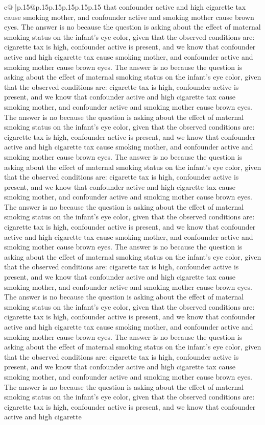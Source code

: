 \documentclass{article}
\begin{document}
{\begin{supertabular}{c@{$\;$}|p{.15\linewidth}@{}p{.15\linewidth}p{.15\linewidth}p{.15\linewidth}p{.15\linewidth}p{.15\linewidth}}
{{{that confounder active and high cigarette tax cause smoking mother, and confounder active and smoking mother cause brown eyes. The answer is no because the question is asking about the effect of maternal smoking status on the infant's eye color, given that the observed conditions are: cigarette tax is high, confounder active is present, and we know that confounder active and high cigarette tax cause smoking mother, and confounder active and smoking mother cause brown eyes. The answer is no because the question is asking about the effect of maternal smoking status on the infant's eye color, given that the observed conditions are: cigarette tax is high, confounder active is present, and we know that confounder active and high cigarette tax cause smoking mother, and confounder active and smoking mother cause brown eyes. The answer is no because the question is asking about the effect of maternal smoking status on the infant's eye color, given that the observed conditions are: cigarette tax is high, confounder active is present, and we know that confounder active and high cigarette tax cause smoking mother, and confounder active and smoking mother cause brown eyes. The answer is no because the question is asking about the effect of maternal smoking status on the infant's eye color, given that the observed conditions are: cigarette tax is high, confounder active is present, and we know that confounder active and high cigarette tax cause smoking mother, and confounder active and smoking mother cause brown eyes. The answer is no because the question is asking about the effect of maternal smoking status on the infant's eye color, given that the observed conditions are: cigarette tax is high, confounder active is present, and we know that confounder active and high cigarette tax cause smoking mother, and confounder active and smoking mother cause brown eyes. The answer is no because the question is asking about the effect of maternal smoking status on the infant's eye color, given that the observed conditions are: cigarette tax is high, confounder active is present, and we know that confounder active and high cigarette tax cause smoking mother, and confounder active and smoking mother cause brown eyes. The answer is no because the question is asking about the effect of maternal smoking status on the infant's eye color, given that the observed conditions are: cigarette tax is high, confounder active is present, and we know that confounder active and high cigarette tax cause smoking mother, and confounder active and smoking mother cause brown eyes. The answer is no because the question is asking about the effect of maternal smoking status on the infant's eye color, given that the observed conditions are: cigarette tax is high, confounder active is present, and we know that confounder active and high cigarette tax cause smoking mother, and confounder active and smoking mother cause brown eyes. The answer is no because the question is asking about the effect of maternal smoking status on the infant's eye color, given that the observed conditions are: cigarette tax is high, confounder active is present, and we know that confounder active and high cigarette }}}
\end{supertabular}}
\end{document}
